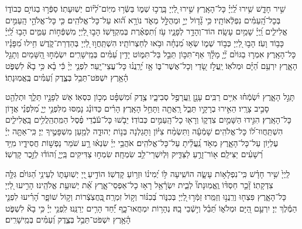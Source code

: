 \documentclass[twoside, openany, parskip=half, 11pt]{book}
\begin{document}
 
 שִׁ֣יר חָדָ֑שׁ שִׁ֥ירוּ לַֽ֝יְיָ֗ כָּל־הָאָֽרֶץ׃ 
 שִׁ֣ירוּ לַ֭יְיָ בָּֽרֲכ֣וּ שְׁמ֑וֹ בַּשְּֿׂר֥וּ מִיּֽוֹם־לְ֝י֗וֹם יְשֽׁוּעָתֽוֹ׃ 
 סַפְּֿר֣וּ בַגּוֹיִ֣ם כְּבוֹד֑וֹ בְּכָל־הָֽ֝עַמִּ֗ים נִפְלְֿאוֹתָֽיו׃ 
 כִּ֥י גָ֘ד֤וֹל יְיָ֣ וּמְהֻלָּ֣ל מְאֹ֑ד נוֹרָ֥א ה֝֗וּא עַל־כָּל־אֱלֹהִֽים׃ 
 כִּ֤י כָּל־אֱלֹהֵ֣י הָֽעַמִּ֣ים אֱלִילִ֑ים וַֽ֝יְיָ֗ שָׁמַ֥יִם עָשָֽׂה׃ 
 הוֹד־וְהָדָ֥ר לְפָנָ֑יו עֹ֥ז וְ֝תִפְאֶ֗רֶת בְּמִקְדָּשֽׁוֹ׃ 
 הָב֣וּ לַ֭יְיָ מִשְׁפְּֿח֣וֹת עַמִּ֑ים הָב֥וּ לַֽ֝יְיָ֗ כָּב֥וֹד וָעֹֽז׃ 
 הָב֣וּ לַ֭יְיָ כְּב֣וֹד שְׁמ֑וֹ שְׂא֥וּ מִ֝נְחָ֗ה וּבֹ֥אוּ לְחַצְרוֹתָֽיו׃ 
 הִשְׁתַּֽחֲו֣וּ לַ֭יְיָ בְּהַדְרַת־קֹ֑דֶשׁ חִ֥ילוּ מִ֝פָּנָ֗יו כָּל־הָאָֽרֶץ׃ 
 אִמְר֤וּ בַגּוֹיִ֨ם יְ֘יָ֤ מָלָ֗ךְ אַף־תִּכּ֣וֹן תֵּבֵ֣ל בַּל־תִּמּ֑וֹט יָדִ֥ין עַ֝מִּ֗ים בְּמֵֽישָׁרִֽים׃ 
 יִשְׂמְֿח֣וּ הַ֭שָּׁמַיִם וְתָגֵ֣ל הָאָ֑רֶץ יִרְעַ֥ם הַ֝יָּ֗ם וּמְלֹאֽוֹ׃ 
 יַֽעֲלֹ֣ז שָׂ֭דַי וְכָל־אֲשֶׁר־בּ֑וֹ אָ֥ז יְ֝רַֽנֲנ֗וּ כָּל־עֲצֵי־יָֽעַר׃ 
 לִפְנֵ֤י יְיָ֨ כִּ֬י בָ֗א כִּ֥י בָא֘ לִשְׁפֹּ֢ט הָ֫אָ֥רֶץ יִשְׁפֹּט־תֵּבֵ֥ל בְּצֶ֑דֶק וְ֝עַמִּ֗ים בֶּֽאֱמֽוּנָתֽוֹ׃

  
 תָּגֵ֣ל הָאָ֑רֶץ יִ֝שְׂמְֿח֗וּ אִיִּ֥ים רַבִּֽים׃ 
 עָנָ֣ן וַֽעֲרָפֶ֣ל סְבִיבָ֑יו צֶ֥דֶק וּ֝מִשְׁפָּ֗ט מְכ֣וֹן כִּסְאֽוֹ׃ 
 אֵשׁ לְפָנָ֣יו תֵּלֵ֑ךְ וּתְלַהֵ֖ט סָבִ֣יב צָרָֽיו׃ 
 הֵאִ֣ירוּ בְרָקָ֣יו תֵּבֵ֑ל רָֽאֲתָ֖ה וַתָּחֵ֣ל הָאָֽרֶץ׃ 
 הָרִ֗ים כַּדּוֹנַ֗ג נָמַסּוּ מִלִּפְנֵ֣י יְיָ֑ מִ֝לִּפְנֵ֗י אֲד֣וֹן כָּל־הָאָֽרֶץ׃ 
 הִגִּ֣ידוּ הַשָּׁמַ֣יִם צִדְק֑וֹ וְרָא֖וּ כָל־הָֽעַמִּ֣ים כְּבוֹדֽוֹ׃ 
 יֵבֹ֤שׁוּ כָּל־עֹ֬בְֿדֵי פֶ֗סֶל הַמִּֽתְהַֽלֲלִ֥ים בָּֽאֱלִילִ֑ים הִשְׁתַּֽחֲווּ־ל֝וֹ כָּל־אֱלֹהִֽים׃ 
 שָׁמְֿעָ֬ה וַתִּשְׂמַ֨ח צִיּ֗וֹן וַתָּגֵלְנָה בְּנ֣וֹת יְהוּדָ֑ה לְמַ֖עַן מִשְׁפָּטֶ֣יךָ יְיָ׃ 
 כִּֽי־אַתָּ֤ה יְיָ֗ עֶלְי֥וֹן עַל־כָּל־הָאָ֑רֶץ מְאֹ֥ד נַֽ֝עֲלֵ֗יתָ עַל־כָּל־אֱלֹהִֽים׃ 
 אֹהֲבֵ֥י יְיָ֗ שִׂנְא֫וּ רָ֥ע שֹׁמֵר נַפְשׁ֣וֹת חֲסִידָ֑יו מִיַּ֥ד רְ֝שָׁעִ֗ים יַצִּילֵֽם׃ 
 א֖וֹר־זָרֻ֣עַ לַצַּדִּ֑יק וּֽלְיִשְׁרֵי־לֵ֥ב שִׂמְחָֽה׃ 
שִׂמְח֣וּ צַדִּיקִים בַּֽיְיָ֑ וְ֝הוֹד֗וּ לְזֵ֣כֶר קָדְשֽׁוֹ׃


  
 לַֽיְיָ֙ שִׁ֥יר חָדָ֗שׁ כִּֽי־נִפְלָא֥וֹת עָשָׂ֑ה הוֹשִֽׁיעָה לּ֥וֹ יְ֝מִינ֗וֹ וּזְר֥וֹעַ קָדְשֽׁוֹ׃ 
 הוֹדִ֣יעַ ֖יְיָ יְשֽׁוּעָת֑וֹ לְעֵינֵ֥י הַ֝גּוֹיִ֗ם גִּלָּ֥ה צִדְקָתֽוֹ׃ 
 זָ֘כַ֤ר חַסְדּ֨וֹ וֶֽאֱמֽוּנָתוֹ֘ לְבֵ֢ית יִשְׂרָ֫אֵ֥ל רָא֥וּ כָל־אַפְסֵי־אָ֑רֶץ אֵ֝֗ת יְשׁוּעַ֥ת אֱלֹהֵֽינוּ׃
 הָרִ֣יעוּ לַ֭יְיָ כָּל־הָאָ֑רֶץ פִּצְח֖וּ וְרַֽנֲנ֣וּ וְזַמֵּֽרוּ׃ 
 זַמְּֿר֣וּ ֖לַיְיָ בְּכִנּ֑וֹר בְּ֝כִנּ֗וֹר וְק֣וֹל זִמְרָֽה׃ 
 ֖בַּֽחֲצֹֽצְֿרוֹת וְק֣וֹל שׁוֹפָ֑ר הָ֝רִ֗יעוּ לִפְנֵ֤י הַמֶּ֬לֶךְ יְיָ׃ 
 יִרְעַ֣ם הַ֭יָּם וּמְלֹא֑וֹ תֵּ֝בֵ֗ל וְי֣שְֿׁבֵי בָֽהּ׃ 
 נְהָר֥וֹת יִמְחֲאוּ־כָ֑ף יַ֝֗חַד הָרִ֥ים יְרַנֵּֽנוּ׃ 
 לִֽפְנֵ֥י יְיָ֗ כִּ֥י בָא֘ לִשְׁפֹּ֢ט הָ֫אָ֥רֶץ יִשְׁפֹּט־תֵּבֵ֥ל בְּצֶ֑דֶק וְ֝עַמִּ֗ים בְּמֵֽישָׁרִֽים׃
 
\end{document}
